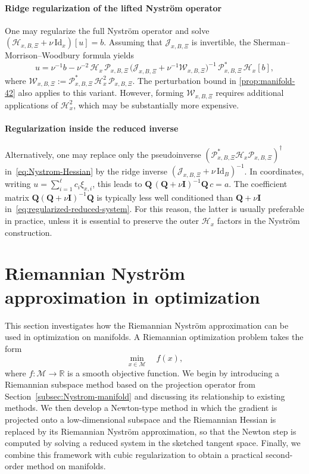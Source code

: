 \documentclass[final,onefignum,onetabnum]{siamart250211}
\begin{document}
  \paragraph{Ridge regularization of the lifted Nystr\"om operator}
  One may regularize the full Nystr\"om operator and solve
  $
  (\mathcal{H}_{x, B, \Xi} + \nu \,\mathrm{Id}_x)[u] = b.
  $
  Assuming that $\mathcal J_{x,B,\Xi}$ is invertible, the Sherman--Morrison--Woodbury formula yields
  \[
    u
    =\nu^{-1}b
    -\nu^{-2}\,\mathcal H_x\,\mathcal P_{x,B,\Xi}\,\bigl(\mathcal J_{x,B,\Xi}+\nu^{-1}\mathcal W_{x,B,\Xi}\bigr)^{-1}\,\mathcal P_{x,B,\Xi}^{*}\,\mathcal H_x[b],
  \]
  where
  $
    \mathcal W_{x,B,\Xi}:=\mathcal P_{x,B,\Xi}^{*}\,\mathcal H_x^{2}\,\mathcal P_{x,B,\Xi}.
  $
  The perturbation bound in \cref{prop:manifold-42} also applies to this variant. However, forming $\mathcal W_{x,B,\Xi}$ requires additional applications of $\mathcal H_x^2$, which may be substantially more expensive.
  
  \paragraph{Regularization inside the reduced inverse}
  Alternatively, one may replace only the pseudoinverse $(\mathcal{P}_{x,B,\Xi}^{*}\mathcal{H}_x\mathcal{P}_{x,B,\Xi})^{\dagger}$ in~\eqref{eq:Nystrom-Hessian} by the ridge inverse $(\mathcal J_{x,B,\Xi}+\nu\,\mathrm{Id}_B)^{-1}$.
  In coordinates, writing $u=\sum_{i=1}^{\ell}c_i\xi_{x,i}$, this leads to
  $
    \mathbf{Q}\,(\mathbf{Q}+\nu \mathbf{I})^{-1}\mathbf{Q}\,c=a.
  $
  The coefficient matrix $\mathbf{Q}(\mathbf{Q}+\nu \mathbf{I})^{-1}\mathbf{Q}$ is typically less well conditioned than $\mathbf{Q}+\nu \mathbf{I}$ in~\eqref{eq:regularized-reduced-system}. For this reason, the latter is usually preferable in practice, unless it is essential to preserve the outer $\mathcal H_x$ factors in the Nystr\"om construction.

\section{Riemannian Nystr\"om approximation in optimization}
\label{sec:riemannian-newton} 

This section investigates how the Riemannian Nystr\"om approximation can be used in optimization on manifolds. A Riemannian optimization problem takes the form
\[
\min_{x \in \mathcal{M}} \quad f(x),
\]
where $f \colon \mathcal{M} \to \mathbb{R}$ is a smooth objective function. We begin by introducing a Riemannian subspace method based on the projection operator from Section~\ref{subsec:Nystrom-manifold} and discussing its relationship to existing methods. We then develop a Newton-type method in which the gradient is projected onto a low-dimensional subspace and the Riemannian Hessian is replaced by its Riemannian Nystr\"om approximation, so that the Newton step is computed by solving a reduced system in the sketched tangent space. Finally, we combine this framework with cubic regularization to obtain a practical second-order method on manifolds.
\end{document}
